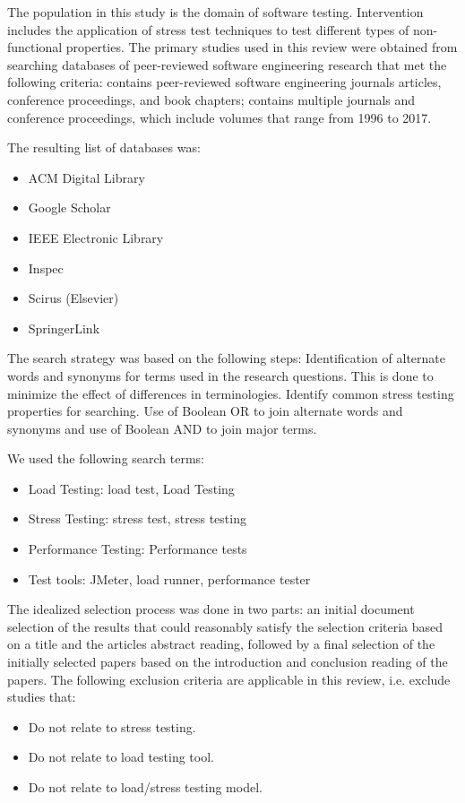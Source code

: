 \documentclass[espaco=umemeio,chapter=TITLE,twoside,openright]{abnt}
\begin{document}
The population in this study is the domain of software testing. Intervention includes the application of stress test techniques to test different types of non-functional properties. The primary studies used in this review were obtained from
searching databases of peer-reviewed software engineering research that met the following criteria: contains peer-reviewed software engineering journals articles, conference proceedings, and book chapters; contains multiple journals and conference proceedings,
which include volumes that range from 1996 to 2017.

The resulting list of databases was:

\begin{itemize}
\item  ACM Digital Library
\item  Google Scholar
\item  IEEE Electronic Library
\item  Inspec
\item  Scirus (Elsevier)
\item SpringerLink
\end{itemize}


The search strategy was based on the following steps:  Identification of alternate words and synonyms for terms used
in the research questions. This is done to minimize the effect
of differences in terminologies. Identify common stress testing properties for searching.  Use of Boolean OR to join alternate words and synonyms and use of Boolean AND to join major terms.

We used the following search terms:

\begin{itemize}
\item Load Testing: load test, Load Testing
\item Stress Testing: stress test, stress testing
\item Performance Testing: Performance tests
\item Test tools: JMeter, load runner, performance tester
\end{itemize}



The idealized selection process was done in two parts: an initial document selection of the results that could reasonably satisfy the selection criteria based on a title and the articles abstract reading, followed by a final selection of the initially selected papers based on the introduction and conclusion reading of the papers. The following exclusion criteria are applicable in this review, i.e. exclude studies that:
\begin{itemize}
\item Do not relate to stress testing.
\item Do not relate to load testing tool.
\item Do not relate to load/stress testing model.
\end{itemize}
\end{document}
